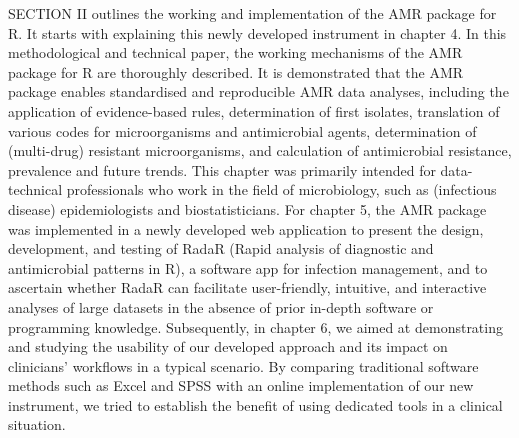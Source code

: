 \documentclass[
]{book}
\begin{document}
SECTION II outlines the working and implementation of the AMR package for R. It starts with explaining this newly developed instrument in chapter 4. In this methodological and technical paper, the working mechanisms of the AMR package for R are thoroughly described. It is demonstrated that the AMR package enables standardised and reproducible AMR data analyses, including the application of evidence-based rules, determination of first isolates, translation of various codes for microorganisms and antimicrobial agents, determination of (multi-drug) resistant microorganisms, and calculation of antimicrobial resistance, prevalence and future trends. This chapter was primarily intended for data-technical professionals who work in the field of microbiology, such as (infectious disease) epidemiologists and biostatisticians. For chapter 5, the AMR package was implemented in a newly developed web application to present the design, development, and testing of RadaR (Rapid analysis of diagnostic and antimicrobial patterns in R), a software app for infection management, and to ascertain whether RadaR can facilitate user-friendly, intuitive, and interactive analyses of large datasets in the absence of prior in-depth software or programming knowledge. Subsequently, in chapter 6, we aimed at demonstrating and studying the usability of our developed approach and its impact on clinicians' workflows in a typical scenario. By comparing traditional software methods such as Excel and SPSS with an online implementation of our new instrument, we tried to establish the benefit of using dedicated tools in a clinical situation.
\end{document}
